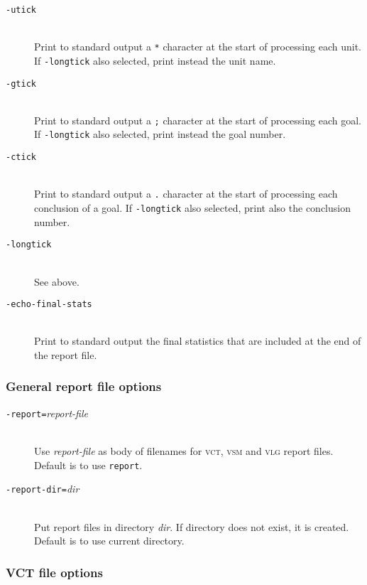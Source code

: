 \documentclass[12pt,fleqn]{article}
\newcommand{\logfile}{\textsc{vlg}}
\newcommand{\csv}{\textsc{vct}}
\newcommand{\sumfile}{\textsc{vsm}}
\newcommand{\optionb}[1]{\item[\texttt{-{#1}}]\ \\}
\newcommand{\optionv}[2]{\item[\texttt{-{#1}=}\mdseries\textit{#2}]\ \\}
\begin{document}
\begin{description}
\optionb{utick} Print to standard output a \texttt{*} character at the 
  start of processing each unit.
  If \texttt{-longtick} also selected, print instead 
  the unit name.
\optionb{gtick} Print to standard output a \texttt{;} character at the 
  start of processing each goal.  
  If \texttt{-longtick} also selected, print instead 
  the goal number.
\optionb{ctick} Print to standard output a \texttt{.} character at the 
  start of processing each conclusion of a goal.
  If \texttt{-longtick} also selected, print also
  the conclusion number.
\optionb{longtick} See above.

\optionb{echo-final-stats}
  Print to standard output the final statistics that are included at the
  end of the report file.
\end{description}


\subsubsection{General report file options}

\begin{description}
\optionv{report}{report-file}
   Use \textit{report-file} as body of filenames for \csv{}, \sumfile{} and
   \logfile{} report files.  Default is to use \texttt{report}.

\optionv{report-dir}{dir}
   Put report files in directory \textit{dir}.  If directory does not exist,
   it is created.  Default is to use current directory.
\end{description}

\subsubsection{VCT file options}
\end{document}
